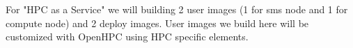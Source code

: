For "HPC as a Service" we will building 2 user images (1 for sms node and 1 for compute node) and 2 deploy images. User images we build here will be customized with OpenHPC using HPC specific elements. 